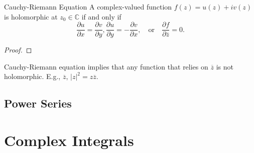 \begin{theorem}{Cauchy-Riemann Equation}{}
  A complex-valued function $f(z) = u(z) + iv(z)$ is holomorphic at $z_0 \in \mathbb{C}$ if and
  only if
  \begin{equation}
    \frac{\partial u}{\partial x} = \frac{\partial v}{\partial y},
    \frac{\partial u}{\partial y} = - \frac{\partial v}{\partial x}, \quad
    \text{or} \quad
    \frac{\partial f}{\partial \overline{z}} = 0.
  \end{equation}
\end{theorem}

\begin{proof}
  
\end{proof}

\begin{note}
  Cauchy-Riemann equation implies that any function that relies on
  $\overline{z}$ is not holomorphic.
  E.g., $\overline{z}$, $|z|^2 = z\overline{z}$.
\end{note}

\subsection{Power Series}

\section{Complex Integrals}





